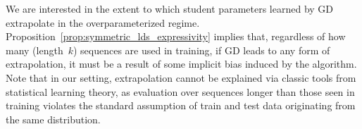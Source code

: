 We are interested in the extent to which student parameters learned by GD extrapolate in the overparameterized regime.
Proposition~\ref{prop:symmetric_lds_expressivity} implies that, regardless of how many (length~$k$) sequences are used in training, if GD leads to any form of extrapolation, it must be a result of some implicit bias induced by the algorithm.
Note that in our setting, extrapolation cannot be explained via classic tools from statistical learning theory, as evaluation over sequences longer than those seen in training violates the standard assumption of train and test data originating from the same distribution.

